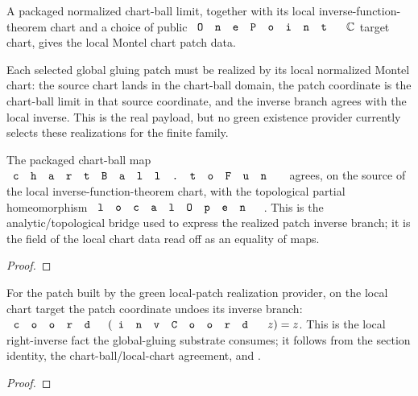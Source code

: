 \begin{lemma}
\label{lem:montel-local-chart-patch-from-limit}
A packaged normalized chart-ball limit, together with its local
inverse-function-theorem chart and a choice of public \(\code{OnePoint}\,\C\)
target chart, gives the local Montel chart patch data.
\leanok
\end{lemma}

\begin{lemma}
\label{lem:montel-local-patch-realization}
Each selected global gluing patch must be realized by its local normalized
Montel chart: the source chart lands in the chart-ball domain, the patch
coordinate is the chart-ball limit in that source coordinate, and the inverse
branch agrees with the local inverse. This is the real
 payload, but no green existence
provider currently selects these realizations for the finite family.
\end{lemma}

\begin{lemma}
\label{lem:montel-realization-toFun-eq-localOpen}
The packaged chart-ball map \(\code{chartBall.toFun}\) agrees, on the source of
the local inverse-function-theorem chart, with the topological partial
homeomorphism \(\code{localOpen}\). This is the analytic/topological bridge used
to express the realized patch inverse branch; it is the
 field of the local chart data read off as an
equality of maps.
\leanok
\end{lemma}
\begin{proof}\leanok\end{proof}

\begin{lemma}
\label{lem:montel-realization-coord-invcoord}
For the patch built by the green local-patch realization provider, on the local
chart target the patch coordinate undoes its inverse branch:
\(\code{coord}(\code{invCoord}\,z)=z\). This is the local right-inverse fact the
global-gluing substrate consumes; it follows from the section identity, the
chart-ball/local-chart agreement, and .
\leanok
\end{lemma}
\begin{proof}\leanok\end{proof}

